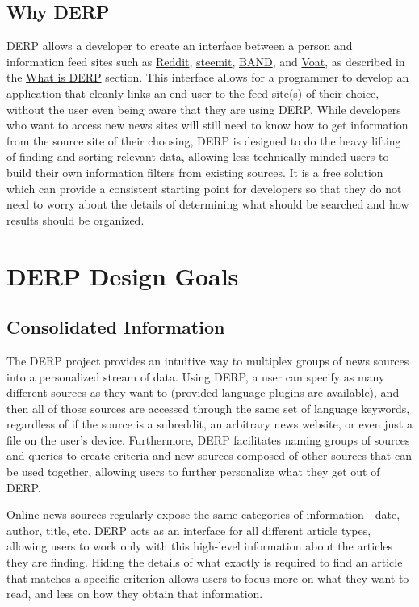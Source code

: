 \documentclass{article}
\begin{document}
\subsection{Why DERP}
DERP allows a developer to create an interface between a person and information feed sites such as \href{https://www.reddit.com}{Reddit}, \href{https://steemit.com/}{steemit}, \href{https://band.us/home}{BAND}, and \href{https://voat.co/}{Voat}, as described in the \hyperref[sec:whatisDERP]{What is DERP} section. This interface allows for a programmer to develop an application that cleanly links an end-user to the feed site(s) of their choice, without the user even being aware that they are using DERP. While developers who want to access new news sites will still need to know how to get information from the source site of their choosing, DERP is designed to do the heavy lifting of finding and sorting relevant data, allowing less technically-minded users to build their own information filters from existing sources. It is a free solution which can provide a consistent starting point for developers so that they do not need to worry about the details of determining what should be searched and how results should be organized.


\newpage
\section{DERP Design Goals}
\subsection{Consolidated Information}
The DERP project provides an intuitive way to multiplex groups of news sources into a personalized stream of data. Using DERP, a user can specify as many different sources as they want to (provided language plugins are available), and then all of those sources are accessed through the same set of language keywords, regardless of if the source is a subreddit, an arbitrary news website, or even just a file on the user's device. Furthermore, DERP facilitates naming groups of sources and queries to create criteria and new sources composed of other sources that can be used together, allowing users to further personalize what they get out of DERP.

Online news sources regularly expose the same categories of information - date, author, title, etc. DERP acts as an interface for all different article types, allowing users to work only with this high-level information about the articles they are finding. Hiding the details of what exactly is required to find an article that matches a specific criterion allows users to focus more on what they want to read, and less on how they obtain that information.
\end{document}
